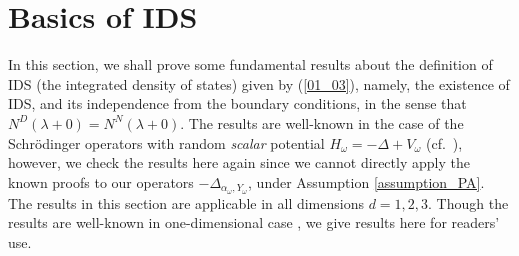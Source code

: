 \documentclass[12pt,a4paper]{article}
\begin{document}
\section{Basics of IDS}
In this section,
we shall prove some fundamental results 
about the definition of IDS (the integrated density of states)
given by (\ref{01_03}),
namely,
the existence of IDS,
and its independence from the boundary conditions,
in the sense that $N^D(\lambda+0)=N^N(\lambda+0)$.
The results are well-known in the case of
the Schr\"odinger operators with random \textit{scalar} potential 
$H_\omega=-\Delta + V_\omega$ (cf.\ \cite{Ca-La, Pa-Fi}),
however, we check the results here again since
we cannot directly apply the known proofs to 
our operators $-\Delta_{\alpha_\omega, Y_\omega}$,
under Assumption \ref{assumption_PA}.
The results in this section are applicable in all dimensions $d=1,2,3$.
Though the results are well-known in one-dimensional case
\cite{Fr-Ll,Ko, Lu-Sy},
we give results here for readers' use.
\end{document}
